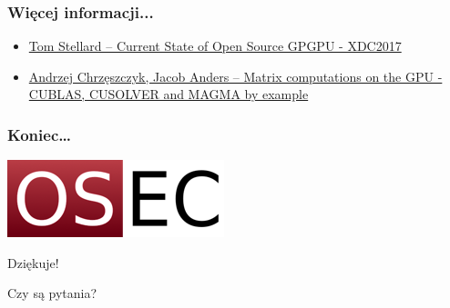 \documentclass[dvipsnames,table]{beamer}
\begin{document}
\begin{frame}
\frametitle{Więcej informacji...}
\begin{itemize}
	\item \href{https://www.x.org/wiki/Events/XDC2017/Stellard_GPGPU.pdf}{Tom Stellard -- Current State of Open Source GPGPU - XDC2017}
	\item \href{https://developer.nvidia.com/sites/default/files/akamai/cuda/files/Misc/mygpu.pdf}{Andrzej Chrzęszczyk, Jacob Anders -- Matrix computations on the GPU - CUBLAS, CUSOLVER and MAGMA by example}

\end{itemize}
\end{frame}

\begin{frame}
\frametitle{Koniec\ldots}
\begin{center}
\includegraphics[scale=0.5]{img-oseclogo.png}

Dziękuje!

Czy są pytania?

\end{center}
\end{frame}
\end{document}
